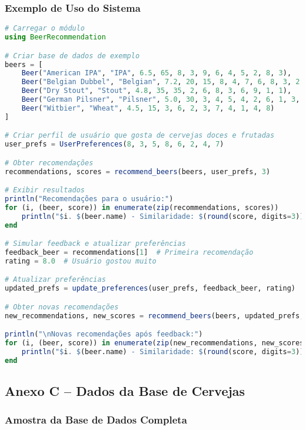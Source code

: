 \documentclass[12pt,a4paper]{article}
\begin{document}
\subsubsection{Exemplo de Uso do Sistema}

\begin{lstlisting}[language=Julia, caption=Exemplo de uso do sistema de recomendação]
# Carregar o módulo
using BeerRecommendation

# Criar base de dados de exemplo
beers = [
    Beer("American IPA", "IPA", 6.5, 65, 8, 3, 9, 6, 4, 5, 2, 8, 3),
    Beer("Belgian Dubbel", "Belgian", 7.2, 20, 15, 8, 4, 7, 6, 8, 3, 2, 4),
    Beer("Dry Stout", "Stout", 4.8, 35, 35, 2, 6, 8, 3, 6, 9, 1, 1),
    Beer("German Pilsner", "Pilsner", 5.0, 30, 3, 4, 5, 4, 2, 6, 1, 3, 5),
    Beer("Witbier", "Wheat", 4.5, 15, 3, 6, 2, 3, 7, 4, 1, 4, 8)
]

# Criar perfil de usuário que gosta de cervejas doces e frutadas
user_prefs = UserPreferences(8, 3, 5, 8, 6, 2, 4, 7)

# Obter recomendações
recommendations, scores = recommend_beers(beers, user_prefs, 3)

# Exibir resultados
println("Recomendações para o usuário:")
for (i, (beer, score)) in enumerate(zip(recommendations, scores))
    println("$i. $(beer.name) - Similaridade: $(round(score, digits=3))")
end

# Simular feedback e atualizar preferências
feedback_beer = recommendations[1]  # Primeira recomendação
rating = 8.0  # Usuário gostou muito

# Atualizar preferências
updated_prefs = update_preferences(user_prefs, feedback_beer, rating)

# Obter novas recomendações
new_recommendations, new_scores = recommend_beers(beers, updated_prefs, 3)

println("\nNovas recomendações após feedback:")
for (i, (beer, score)) in enumerate(zip(new_recommendations, new_scores))
    println("$i. $(beer.name) - Similaridade: $(round(score, digits=3))")
end
\end{lstlisting}

\subsection{Anexo C -- Dados da Base de Cervejas}

\subsubsection{Amostra da Base de Dados Completa}
\end{document}
